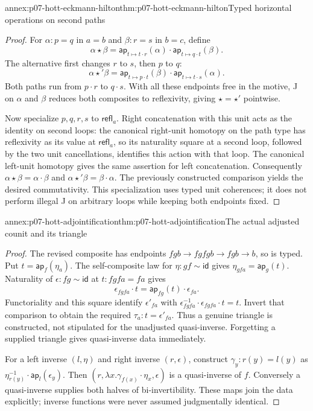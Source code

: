 \begin{annexitem}{annex:p07-hott-eckmann-hilton}{thm:p07-hott-eckmann-hilton}{Typed horizontal operations on second paths}
\begin{proof}
For $\alpha:p=q$ in $a=b$ and $\beta:r=s$ in $b=c$, define
\[
 \alpha\star\beta=
 \mathsf{ap}_{t\mapsto t\cdot r}(\alpha)\cdot
 \mathsf{ap}_{t\mapsto q\cdot t}(\beta).
\]
The alternative first changes $r$ to $s$, then $p$ to $q$:
\[
 \alpha\star'\beta=
 \mathsf{ap}_{t\mapsto p\cdot t}(\beta)\cdot
 \mathsf{ap}_{t\mapsto t\cdot s}(\alpha).
\]
Both paths run from $p\cdot r$ to $q\cdot s$. With all these endpoints
free in the motive, J on $\alpha$ and $\beta$ reduces both composites
to reflexivity, giving $\star=\star'$ pointwise.

Now specialize $p,q,r,s$ to $\mathsf{refl}_a$. Right concatenation
with this unit acts as the identity on second loops: the canonical
right-unit homotopy on the path type has reflexivity as its value at
$\mathsf{refl}_a$, so its naturality square at a second loop, followed
by the two unit cancellations, identifies this action with that loop.
The canonical left-unit homotopy gives the same assertion for left
concatenation. Consequently $\alpha\star\beta=\alpha\cdot\beta$
and $\alpha\star'\beta=\beta\cdot\alpha$. The previously constructed
comparison yields the desired commutativity. This specialization uses
typed unit coherences; it does not perform illegal J on arbitrary loops
while keeping both endpoints fixed.
\end{proof}
\end{annexitem}

\begin{annexitem}{annex:p07-hott-adjointification}{thm:p07-hott-adjointification}{The actual adjusted counit and its triangle}
\begin{proof}
The revised composite has endpoints
$f g b\to f g f g b\to f g b\to b$, so is typed.
Put $t=\mathsf{ap}_f(\eta_a)$. The self-composite law for
$\eta:g f\sim\mathsf{id}$ gives
$\eta_{g f a}=\mathsf{ap}_g(t)$.
Naturality of $\epsilon:f g\sim\mathsf{id}$ at
$t:f g f a=f a$ gives
\[
 \epsilon_{f g f a}\cdot t
 =\mathsf{ap}_{f g}(t)\cdot\epsilon_{f a}.
\]
Functoriality and this square identify
$\epsilon'_{f a}$ with
$\epsilon_{f g f a}^{-1}\cdot\epsilon_{f g f a}\cdot t=t$.
Invert that comparison to obtain the required
$\tau_a:t=\epsilon'_{f a}$. Thus a genuine triangle is constructed,
not stipulated for the unadjusted quasi-inverse. Forgetting a supplied
triangle gives quasi-inverse data immediately.

For a left inverse $(l,\eta)$ and right inverse $(r,\epsilon)$,
construct $\gamma_y:r(y)=l(y)$ as
$\eta_{r(y)}^{-1}\cdot\mathsf{ap}_l(\epsilon_y)$.
Then $(r,\lambda x.\gamma_{f(x)}\cdot\eta_x,\epsilon)$ is a
quasi-inverse of $f$. Conversely a quasi-inverse supplies both halves
of bi-invertibility. These maps join the data explicitly; inverse
functions were never assumed judgmentally identical.
\end{proof}
\end{annexitem}

